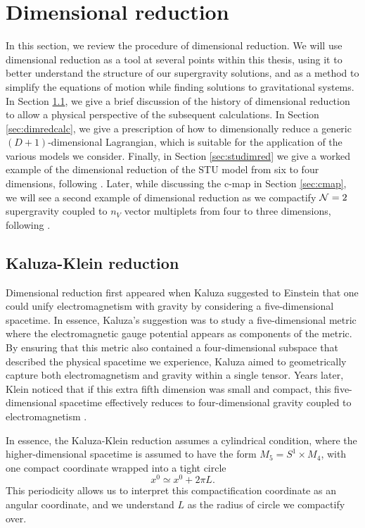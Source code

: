 \section{Dimensional reduction}
\label{sec:dimreduction}
In this section, we review the procedure of dimensional reduction. We will use dimensional reduction as a tool at several points within this thesis, using it to better understand the structure of our supergravity solutions, and as a method to simplify the equations of motion while finding solutions to gravitational systems. In Section \ref{sec:kkred}, we give a brief discussion of the history of dimensional reduction to allow a physical perspective of the subsequent calculations. In Section \ref{sec:dimredcalc}, we give a prescription of how to dimensionally reduce a generic $(D+1)$-dimensional Lagrangian, which is suitable for the application of the various models we consider. Finally, in Section \ref{sec:studimred} we give a worked example of the dimensional reduction of the STU model from six to four dimensions, following \cite{Chow:2013gba}. Later, while discussing the c-map in Section \ref{sec:cmap}, we will see a second example of dimensional reduction as we compactify ${\cal N} = 2$ supergravity coupled to $n_V$ vector multiplets from four to three dimensions, following \cite{Mohaupt:2011aa, Vaughan:2012}.

\subsection{Kaluza-Klein reduction}
\label{sec:kkred}
Dimensional reduction first appeared when Kaluza \cite{Kaluza:1921tu} suggested to Einstein that one could unify electromagnetism with gravity by considering a five-dimensional spacetime. In essence, Kaluza's suggestion was to study a five-dimensional metric where the electromagnetic gauge potential appears as components of the metric. By ensuring that this metric also contained a four-dimensional subspace that described the physical spacetime we experience, Kaluza aimed to geometrically capture both electromagnetism and gravity within a single tensor. Years later, Klein noticed that if this extra fifth dimension was small and compact, this five-dimensional spacetime effectively reduces to four-dimensional gravity coupled to electromagnetism \cite{Klein:1926fj}. 

In essence, the Kaluza-Klein reduction assumes a cylindrical condition, where the higher-dimensional spacetime is assumed to have the form $M_5 = S^1 \times M_4$, with one compact coordinate wrapped into a tight circle
\begin{equation*}
	x^0 \simeq x^0 + 2\pi L.
\end{equation*}
This periodicity allows us to interpret this compactification coordinate as an angular coordinate, and we understand $L$ as the radius of circle we compactify over.

